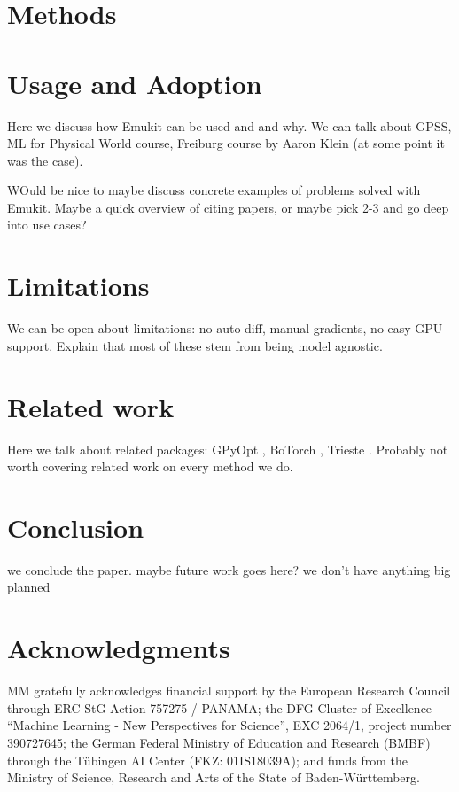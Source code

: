 \section{Methods}


\section{Usage and Adoption}
Here we discuss how Emukit can be used and and why. We can talk about GPSS, ML for Physical World course, Freiburg course by Aaron Klein (at some point it was the case). 

WOuld be nice to maybe discuss concrete examples of problems solved with Emukit. Maybe a quick overview of citing papers, or maybe pick 2-3 and go deep into use cases? 

\section{Limitations}
We can be open about limitations: no auto-diff, manual gradients, no easy GPU support. Explain that most of these stem from being model agnostic.

\section{Related work}
Here we talk about related packages: GPyOpt \cite{gpyopt2016}, BoTorch \cite{balandat2020botorch}, Trieste \cite{picheny2023trieste}. Probably not worth covering related work on every method we do.

\section{Conclusion}
we conclude the paper. maybe future work goes here? we don't have anything big planned

\section{Acknowledgments}
MM gratefully acknowledges financial support by the European Research Council through ERC StG Action 757275 / PANAMA; the DFG Cluster of Excellence “Machine Learning - New Perspectives for Science”, EXC 2064/1, project number 390727645; the German Federal Ministry of Education and Research (BMBF) through the T\"{u}bingen AI Center (FKZ: 01IS18039A); and funds from the Ministry of Science, Research and Arts of the State of Baden-W\"{u}rttemberg.
